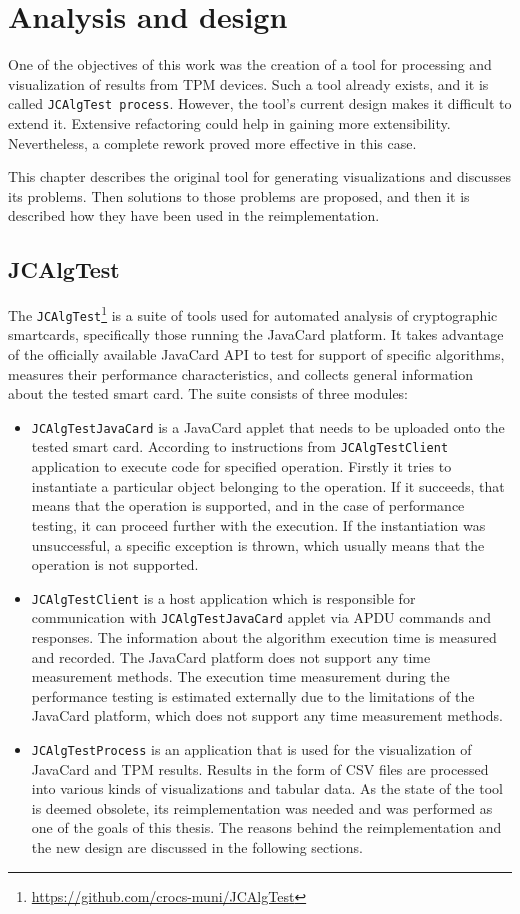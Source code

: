 \chapter{Analysis and design}
One of the objectives of this work was the creation of a tool for processing and visualization of results from TPM devices. Such a tool already exists, and it is called \texttt{JCAlgTest process}. However, the tool's current design makes it difficult to extend it. Extensive refactoring could help in gaining more extensibility. Nevertheless, a complete rework proved more effective in this case.

This chapter describes the original tool for generating visualizations and discusses its problems. Then solutions to those problems are proposed, and then it is described how they have been used in the reimplementation.

\section{JCAlgTest}
The \texttt{JCAlgTest}\footnote{\url{https://github.com/crocs-muni/JCAlgTest}} is a suite of tools used for automated analysis of cryptographic smartcards, specifically those running the JavaCard platform. It takes advantage of the officially available JavaCard API to test for support of specific algorithms, measures their performance characteristics, and collects general information about the tested smart card. The suite consists of three modules:
\begin{itemize}
  \item
        \texttt{JCAlgTestJavaCard} is a JavaCard applet that needs to be uploaded onto the tested smart card. According to instructions from \texttt{JCAlgTestClient} application to execute code for specified operation. Firstly it tries to instantiate a particular object belonging to the operation. If it succeeds, that means that the operation is supported, and in the case of performance testing, it can proceed further with the execution. If the instantiation was unsuccessful, a specific exception is thrown, which usually means that the operation is not supported.
  \item
        \texttt{JCAlgTestClient} is a host application which is responsible for communication with \texttt{JCAlgTestJavaCard} applet via APDU commands and responses. The information about the algorithm execution time is measured and recorded. The JavaCard platform does not support any time measurement methods. The execution time measurement during the performance testing is estimated externally due to the limitations of the JavaCard platform, which does not support any time measurement methods.
  \item
        \texttt{JCAlgTestProcess} is an application that is used for the visualization of JavaCard and TPM results. Results in the form of CSV files are processed into various kinds of visualizations and tabular data. As the state of the tool is deemed obsolete, its reimplementation was needed and was performed as one of the goals of this thesis. The reasons behind the reimplementation and the new design are discussed in the following sections.
\end{itemize}

